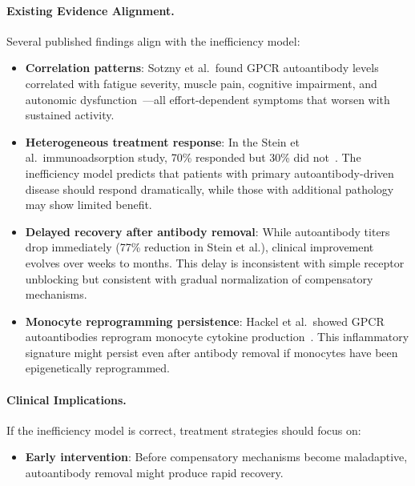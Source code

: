 \begin{speculation}
\paragraph{Existing Evidence Alignment.}

Several published findings align with the inefficiency model:

\begin{itemize}
    \item \textbf{Correlation patterns}: Sotzny et al.\ found GPCR autoantibody levels correlated with fatigue severity, muscle pain, cognitive impairment, and autonomic dysfunction~\cite{Sotzny2021}---all effort-dependent symptoms that worsen with sustained activity.

    \item \textbf{Heterogeneous treatment response}: In the Stein et al.\ immunoadsorption study, 70\% responded but 30\% did not~\cite{Stein2024immunoadsorption}. The inefficiency model predicts that patients with primary autoantibody-driven disease should respond dramatically, while those with additional pathology may show limited benefit.

    \item \textbf{Delayed recovery after antibody removal}: While autoantibody titers drop immediately (77\% reduction in Stein et al.), clinical improvement evolves over weeks to months. This delay is inconsistent with simple receptor unblocking but consistent with gradual normalization of compensatory mechanisms.

    \item \textbf{Monocyte reprogramming persistence}: Hackel et al.\ showed GPCR autoantibodies reprogram monocyte cytokine production~\cite{Hackel2025monocyte}. This inflammatory signature might persist even after antibody removal if monocytes have been epigenetically reprogrammed.
\end{itemize}

\paragraph{Clinical Implications.}

If the inefficiency model is correct, treatment strategies should focus on:

\begin{itemize}
    \item \textbf{Early intervention}: Before compensatory mechanisms become maladaptive, autoantibody removal might produce rapid recovery.


\end{itemize}
\end{speculation}
